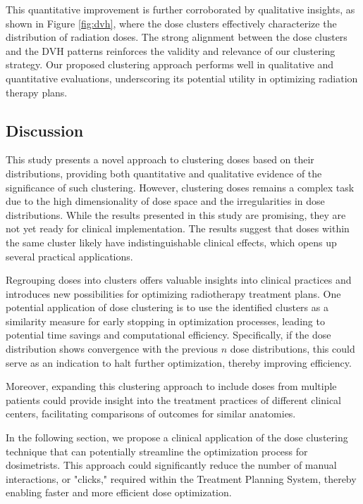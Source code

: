 This quantitative improvement is further corroborated by qualitative insights, as shown in Figure \ref{fig:dvh}, where the dose clusters effectively characterize the distribution of radiation doses.
The strong alignment between the dose clusters and the DVH patterns reinforces the validity and relevance of our clustering strategy.
Our proposed clustering approach performs well in qualitative and quantitative evaluations, underscoring its potential utility in optimizing radiation therapy plans.

\subsection{Discussion}
This study presents a novel approach to clustering doses based on their distributions, providing both quantitative and qualitative evidence of the significance of such clustering.
However, clustering doses remains a complex task due to the high dimensionality of dose space and the irregularities in dose distributions.
While the results presented in this study are promising, they are not yet ready for clinical implementation.
The results suggest that doses within the same cluster likely have indistinguishable clinical effects, which opens up several practical applications.

Regrouping doses into clusters offers valuable insights into clinical practices and introduces new possibilities for optimizing radiotherapy treatment plans.
One potential application of dose clustering is to use the identified clusters as a similarity measure for early stopping in optimization processes, leading to potential time savings and computational efficiency.
Specifically, if the dose distribution shows convergence with the previous $n$ dose distributions, this could serve as an indication to halt further optimization, thereby improving efficiency.

Moreover, expanding this clustering approach to include doses from multiple patients could provide insight into the treatment practices of different clinical centers, facilitating comparisons of outcomes for similar anatomies.

In the following section, we propose a clinical application of the dose clustering technique that can potentially streamline the optimization process for dosimetrists.
This approach could significantly reduce the number of manual interactions, or "clicks," required within the Treatment Planning System, thereby enabling faster and more efficient dose optimization.

